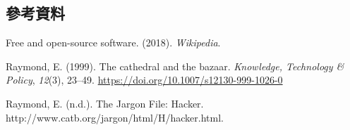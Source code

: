 \documentclass[]{tufte-handout}
\begin{document}
\subsection*{參考資料}\label{reference}

\hypertarget{refs}{}
\hypertarget{ref-2018h}{}
Free and open-source software. (2018). \emph{Wikipedia}.

\hypertarget{ref-raymond1999}{}
Raymond, E. (1999). The cathedral and the bazaar. \emph{Knowledge,
Technology \& Policy}, \emph{12}(3), 23--49.
\url{https://doi.org/10.1007/s12130-999-1026-0}

\hypertarget{ref-raymond}{}
Raymond, E. (n.d.). The Jargon File: Hacker.
http://www.catb.org/jargon/html/H/hacker.html.
\end{document}
